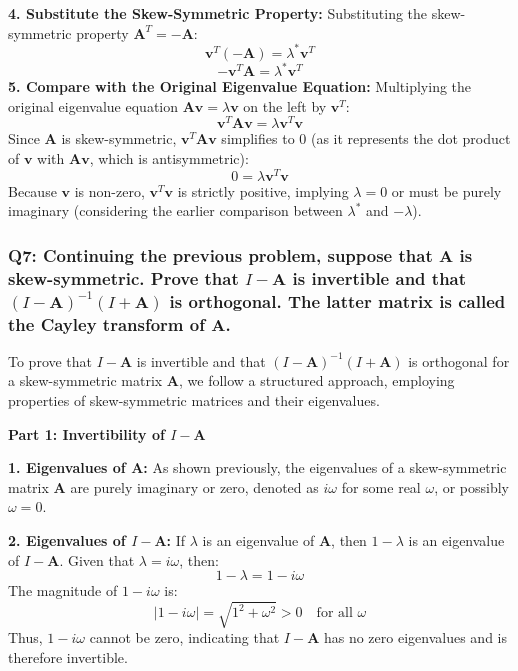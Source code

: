 \documentclass[8pt]{article}
\begin{document}
\textbf{4. Substitute the Skew-Symmetric Property:}
   Substituting the skew-symmetric property \( \mathbf{A}^T = -\mathbf{A} \):
   \[
   \mathbf{v}^T (-\mathbf{A}) = \lambda^* \mathbf{v}^T
   \]
   \[
   -\mathbf{v}^T \mathbf{A} = \lambda^* \mathbf{v}^T
   \]
\textbf{5. Compare with the Original Eigenvalue Equation:}
   Multiplying the original eigenvalue equation \(\mathbf{A}\mathbf{v} = \lambda \mathbf{v}\) on the left by \(\mathbf{v}^T\):
   \[
   \mathbf{v}^T \mathbf{A} \mathbf{v} = \lambda \mathbf{v}^T \mathbf{v}
   \]
   Since \(\mathbf{A}\) is skew-symmetric, \(\mathbf{v}^T \mathbf{A} \mathbf{v}\) simplifies to \(0\) (as it represents the dot product of \(\mathbf{v}\) with \(\mathbf{A}\mathbf{v}\), which is antisymmetric):
   \[
   0 = \lambda \mathbf{v}^T \mathbf{v}
   \]
   Because \(\mathbf{v}\) is non-zero, \(\mathbf{v}^T \mathbf{v}\) is strictly positive, implying \(\lambda = 0\) or must be purely imaginary (considering the earlier comparison between \(\lambda^*\) and \(-\lambda\)).


\subsubsection*{Q7: Continuing the previous problem, suppose that \(\mathbf{A}\) is skew-symmetric. Prove that \(I - \mathbf{A}\) is invertible and that \((I - \mathbf{A})^{-1}(I + \mathbf{A})\) is orthogonal. The latter matrix is called the Cayley transform of \(\mathbf{A}\).}

To prove that \(I - \mathbf{A}\) is invertible and that \((I - \mathbf{A})^{-1}(I + \mathbf{A})\) is orthogonal for a skew-symmetric matrix \(\mathbf{A}\), we follow a structured approach, employing properties of skew-symmetric matrices and their eigenvalues.

\textbf{Part 1: Invertibility of \(I - \mathbf{A}\)}

\textbf{1. Eigenvalues of \(\mathbf{A}\):}
   As shown previously, the eigenvalues of a skew-symmetric matrix \(\mathbf{A}\) are purely imaginary or zero, denoted as \(i\omega\) for some real \(\omega\), or possibly \(\omega = 0\).

\textbf{2. Eigenvalues of \(I - \mathbf{A}\):}
   If \(\lambda\) is an eigenvalue of \(\mathbf{A}\), then \(1 - \lambda\) is an eigenvalue of \(I - \mathbf{A}\). Given that \(\lambda = i\omega\), then:
   \[
   1 - \lambda = 1 - i\omega
   \]
   The magnitude of \(1 - i\omega\) is:
   \[
   |1 - i\omega| = \sqrt{1^2 + \omega^2} > 0 \quad \text{for all } \omega
   \]
   Thus, \(1 - i\omega\) cannot be zero, indicating that \(I - \mathbf{A}\) has no zero eigenvalues and is therefore invertible.
\end{document}
